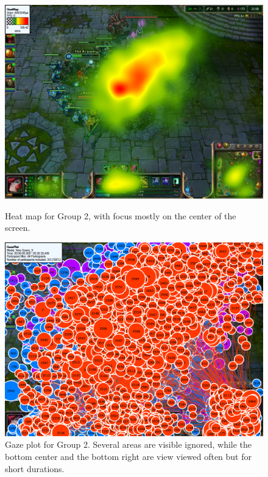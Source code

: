 \documentclass[notitlepage]{report}
\begin{document}
\begin{figure}[!ht]
\begin{minipage}[t]{0.45\linewidth}
\centering
\includegraphics[width=\textwidth]{images/heatmap/Pros}
\caption{Heat map for Group 2, with focus mostly on the center of the screen.}
\label{heat_pro}
\end{minipage}
\hspace{0.5cm}
\begin{minipage}[t]{0.45\linewidth}
\centering
\includegraphics[width=\textwidth]{images/gazeplot/Pros}
\caption{Gaze plot for Group 2. Several areas are visible ignored, while the bottom center and the bottom right are view viewed often but for short durations.}
\label{gaze_pro}
\end{minipage}
\end{figure}
\end{document}
